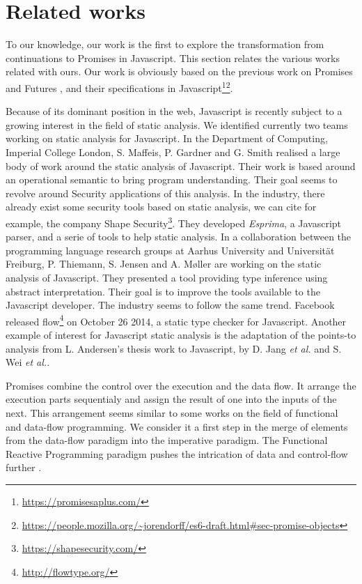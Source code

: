 \section{Related works} \label{section:related}

To our knowledge, our work is the first to explore the transformation from continuations to Promises in Javascript.
This section relates the various works related with ours.
Our work is obviously based on the previous work on Promises and Futures \cite{Liskov1988}, and their specifications in Javascript\footnote{\url{https://promisesaplus.com/}}\footnote{\url{https://people.mozilla.org/~jorendorff/es6-draft.html\#sec-promise-objects}}.


Because of its dominant position in the web, Javascript is recently subject to a growing interest in the field of static analysis.
We identified currently two teams working on static analysis for Javascript.
In the Department of Computing, Imperial College London, S. Maffeis, P. Gardner and G. Smith realised a large body of work around the static analysis of Javascript.
Their work is based around an operational semantic\cite{Maffeis2008} to bring program understanding\cite{Smith2011,Gardner2012,Gardner2013,Bodin2014}.
Their goal seems to revolve around Security applications of this analysis\cite{Maffeis2009,Maffeis2009a}.
In the industry, there already exist some security tools based on static analysis, we can cite for example, the company Shape Security\footnote{\url{https://shapesecurity.com/}}.
They developed \textit{Esprima}, a Javascript parser, and a serie of tools to help static analysis.
In a collaboration between the programming language research groups at Aarhus University and Universität Freiburg, P. Thiemann, S. Jensen and A. Møller are working on the static analysis of Javascript.
They presented a tool providing type inference using abstract interpretation\cite{Thiemann2005,Jensen2009,Jensen2012}.
Their goal is to improve the tools available to the Javascript developer\cite{Andreasen}.
The industry seems to follow the same trend.
Facebook released flow\footnote{\url{http://flowtype.org/}} on October 26 2014, a static type checker for Javascript.
Another example of interest for Javascript static analysis is the adaptation of the points-to analysis from L. Andersen's thesis work\cite{Andersen1994} to Javascript, by D. Jang \textit{et al.}\cite{Jang2009} and S. Wei \textit{et al.}\cite{Wei2014}.

Promises combine the control over the execution and the data flow.
It arrange the execution parts sequentialy and assign the result of one into the inputs of the next.
This arrangement seems similar to some works on the field of functional and data-flow programming.
We consider it a first step in the merge of elements from the data-flow paradigm into the imperative paradigm.
The Functional Reactive Programming paradigm pushes the intrication of data and control-flow further \cite{Winograd-Cort2013,Elliott1997}.

